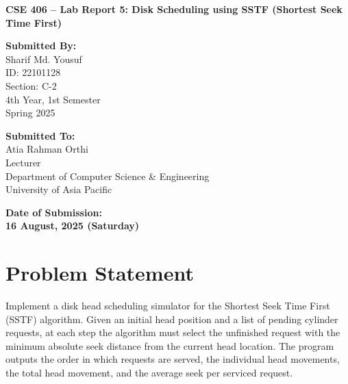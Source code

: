 \documentclass[12pt,a4paper]{article}
\begin{document}
\begin{titlepage}
  \centering
  \vspace*{3cm}

  {\Huge\bfseries CSE 406 – Lab Report 5: Disk Scheduling using SSTF (Shortest Seek Time First) \par}
  \vspace{2.5cm}

  \noindent
  \begin{minipage}[t]{0.48\textwidth}
    {\large\bfseries Submitted By:}\\[0.5em]
    \Large
    Sharif Md. Yousuf \\
    ID: 22101128 \\
    Section: C-2 \\
    4th Year, 1st Semester \\
    Spring 2025
  \end{minipage}
  \hfill
  \begin{minipage}[t]{0.48\textwidth}
    {\large\bfseries Submitted To:}\\[0.5em]
    \Large
    Atia Rahman Orthi \\
    Lecturer \\
    Department of Computer Science \& Engineering \\
    University of Asia Pacific
  \end{minipage}

  \vfill

  {\Large\bfseries Date of Submission:} \\[0.5em]
  {\LARGE\bfseries 16 August, 2025 (Saturday)}

  \vspace*{2cm}
\end{titlepage}

\section{Problem Statement}
Implement a disk head scheduling simulator for the Shortest Seek Time First (SSTF) algorithm. Given an initial head position and a list of pending cylinder requests, at each step the algorithm must select the unfinished request with the minimum absolute seek distance from the current head location. The program outputs the order in which requests are served, the individual head movements, the total head movement, and the average seek per serviced request.
\end{document}
